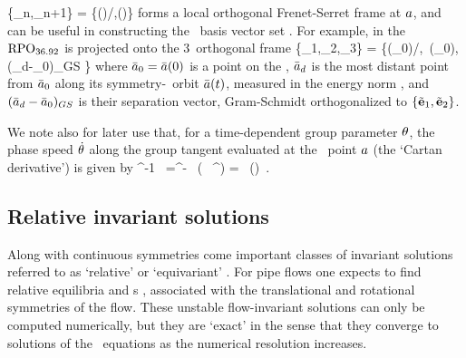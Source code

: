 \documentclass{jfm}
\begin{document}
\beq
\{{\be_n},{\be_{n+1}}\} =
\{\groupTan(\ssp)/\Norm{\groupTan(\ssp)},\normVec(\ssp)\}
forms a local orthogonal Frenet-Serret frame at $a$, and can be useful
in constructing the \statesp\ basis vector set . For
example, in  the \rpo\ $\mathrm{RPO}_{36.92}$ is
projected onto the $3$\dmn\ orthogonal frame
\beq
\{{\be}_1,{\be}_2,{\be}_3\}
=
\left\{{\groupTan(\sspRed_0)}/{},
\,\normVec(\sspRed_0),\,
(\sspRed_d-\sspRed_0)_{GS} \right\}
where $\bar{a}_0=\bar{a}(0)$ is a point on the \rpo, $\bar{a}_d$ is the
most distant point  from $\bar{a}_0$ along its symmetry-\reducedsp\ orbit
$\bar{a}(t)$, measured in the energy norm , and
$(\bar{a}_d-\bar{a}_0)_{GS}$ is their separation vector, Gram-Schmidt
orthogonalized to $\{\tilde{{\bf e}}_1,\tilde{{\bf e}}_2\}$.

We note also for later use that, for a time-dependent group parameter
${\bf \theta}$, the phase speed $\dot{{\bf \theta}}$ along the group tangent
evaluated at the \statesp\ point $a$ (the `Cartan derivative') is
given by
\beq
\LieEl^{-1}\dot{\LieEl} \,\ssp %
     =^{-\gSpace \Lg} \,
\left( \, %
                             ^{\gSpace \Lg}\right)\ssp
    =\dot{\gSpace} \, \groupTan(\ssp)
\,.

\subsection{Relative invariant solutions}
\label{s:RelInvSol}

Along with continuous symmetries come important classes of invariant
solutions referred to as `relative' or `equivariant'
\citep{Huyg1673,Poinc1896}. For pipe flows one expects to find relative
equilibria and \rpo s \citep{Rand82}, associated with the translational
and rotational symmetries of the flow.
These unstable flow-invariant solutions can
only be computed numerically, but they are `exact' in the sense that
they converge to solutions of the \NS\ equations as the
numerical resolution increases.
\end{document}
